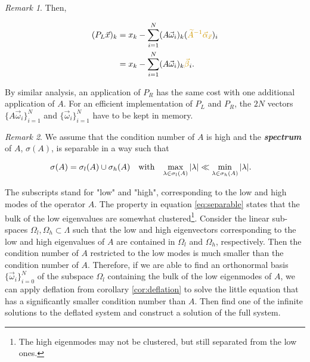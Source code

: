 \documentclass{article}
\theoremstyle{plain} %
\theoremstyle{convention} %
\theoremstyle{remark} %
\newtheorem*{remark}{Remark} %
\def\df#1{\textbf{\textit{#1}}}
\numberwithin{equation}{section}
\begin{document}
\begin{remark}
Then,

\begin{align*}
    (P_L\vec{x})_k &= x_k - \sum_{i=1}^N (A\vec{\omega}_i)_k ( \textcolor{cyellow}{\widetilde{A}^{-1} \vec{\alpha}_{\vec{x}}} )_i \\
    &= x_k - \sum_{i=1}^N (A\vec{\omega}_i)_k \textcolor{cyellow}{\vec{\beta}}_i.
\end{align*}

By similar analysis, an application of $P_R$ has the same cost with one additional application of $A$. For an efficient implementation of $P_L$ and $P_R$, the $2N$ vectors $\{A\vec{\omega}_i\}_{i=1}^N$ and $\{\vec{\omega}_i\}_{i=1}^N$ have to be kept in memory.

\end{remark}

\begin{remark}


We assume that the condition number of $A$ is high and the \df{spectrum} of $A$, $\sigma(A)$, is separable in a way such that

\begin{align}
    \sigma(A) &= \sigma_l(A) \cup \sigma_h(A)
    & &\text{with} &
    \max\limits_{\lambda \in \sigma_l(A)} \abs{\lambda} &\ll \min\limits_{\lambda \in \sigma_h(A)} \abs{\lambda}. \label{eq:separable}
\end{align}

The subscripts stand for "low" and "high", corresponding to the low and high modes of the operator $A$. The property in equation \eqref{eq:separable} states that the bulk of the low eigenvalues are somewhat clustered\footnote{The high eigenmodes may not be clustered, but still separated from the low ones.}. Consider the linear sub-spaces $\Omega_l, \Omega_h \subset \Lambda$ such that the low and high eigenvectors corresponding to the low and high eigenvalues of $A$ are contained in $\Omega_l$ and $\Omega_h$, respectively. Then the condition number of $A$ restricted to the low modes is much smaller than the condition number of $A$. Therefore, if we are able to find an orthonormal basis $\{\vec{\omega}_i\}_{i=0}^N$ of the subspace $\Omega_l$ containing the bulk of the low eigenmodes of $A$, we can apply deflation from corollary \ref{cor:deflation} to solve the little equation that has a significantly smaller condition number than $A$. Then find one of the infinite solutions to the deflated system and construct a solution of the full system.

\end{remark}
\end{document}
